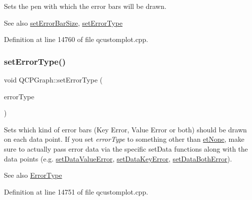 Sets the pen with which the error bars will be drawn. \begin{DoxySeeAlso}{See also}
\hyperlink{class_q_c_p_graph_a10f50c5495ce45ef559ec2066194a335}{set\+Error\+Bar\+Size}, \hyperlink{class_q_c_p_graph_ac3614d799c3894f2bc646e99c7f73d38}{set\+Error\+Type} 
\end{DoxySeeAlso}


Definition at line 14760 of file qcustomplot.\+cpp.

\mbox{\label{class_q_c_p_graph_ac3614d799c3894f2bc646e99c7f73d38}} 
\subsubsection{\texorpdfstring{set\+Error\+Type()}{setErrorType()}}
{\footnotesize\ttfamily void Q\+C\+P\+Graph\+::set\+Error\+Type (\begin{DoxyParamCaption}\item[{\hyperlink{class_q_c_p_graph_ad23b514404bd2cb3216f57c90904d6af}{Error\+Type}}]{error\+Type }\end{DoxyParamCaption})}

Sets which kind of error bars (Key Error, Value Error or both) should be drawn on each data point. If you set {\itshape error\+Type} to something other than \hyperlink{class_q_c_p_graph_ad23b514404bd2cb3216f57c90904d6afaeae745e7cc1766bb8546e35d4b76a711}{et\+None}, make sure to actually pass error data via the specific set\+Data functions along with the data points (e.\+g. \hyperlink{class_q_c_p_graph_acba6296eadcb36b93267628b8dae3de5}{set\+Data\+Value\+Error}, \hyperlink{class_q_c_p_graph_abce9f07c0d722bc3e4fa7bd73c7e5dfa}{set\+Data\+Key\+Error}, \hyperlink{class_q_c_p_graph_a873fe46bdb20be5710428e474ade8908}{set\+Data\+Both\+Error}).

\begin{DoxySeeAlso}{See also}
\hyperlink{class_q_c_p_graph_ad23b514404bd2cb3216f57c90904d6af}{Error\+Type} 
\end{DoxySeeAlso}


Definition at line 14751 of file qcustomplot.\+cpp.

\mbox{\label{class_q_c_p_graph_a513fecccff5b2a50ce53f665338c60ff}} 
